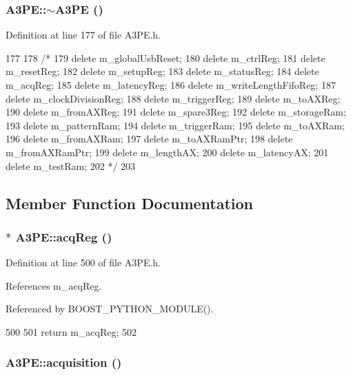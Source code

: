 \hypertarget{classA3PE_aab155e065b455ff439daf47a976399c3}{
\subsubsection[{$\sim$A3PE}]{\setlength{\rightskip}{0pt plus 5cm}A3PE::$\sim$A3PE ()}}
\label{classA3PE_aab155e065b455ff439daf47a976399c3}


Definition at line 177 of file A3PE.h.


\begin{DoxyCode}
177          {
178     /*
179     delete m_globalUsbReset;
180     delete m_ctrlReg;
181     delete m_resetReg;
182     delete m_setupReg;
183     delete m_statusReg;
184     delete m_acqReg;
185     delete m_latencyReg;
186     delete m_writeLengthFifoReg;
187     delete m_clockDivisionReg;
188     delete m_triggerReg;
189     delete m_toAXReg;
190     delete m_fromAXReg;
191     delete m_spare3Reg;
192     delete m_storageRam;
193     delete m_patternRam;
194     delete m_triggerRam;
195     delete m_toAXRam;
196     delete m_fromAXRam;
197     delete m_toAXRamPtr;
198     delete m_fromAXRamPtr;
199     delete m_lengthAX;
200     delete m_latencyAX;
201     delete m_testRam;
202     */
203   }
\end{DoxyCode}


\subsection{Member Function Documentation}
\hypertarget{classA3PE_aca56dadafd70e670e75569ee03d91651}{
\subsubsection[{acqReg}]{$\ast$ A3PE::acqReg ()}}
\label{classA3PE_aca56dadafd70e670e75569ee03d91651}


Definition at line 500 of file A3PE.h.

References m\_\-acqReg.

Referenced by BOOST\_\-PYTHON\_\-MODULE().


\begin{DoxyCode}
500                     {
501     return m_acqReg;
502   }
\end{DoxyCode}
\hypertarget{classA3PE_a035886b99761cc4f3c342ff0b4e44f59}{
\subsubsection[{acquisition}]{ A3PE::acquisition ()}}
\label{classA3PE_a035886b99761cc4f3c342ff0b4e44f59}


